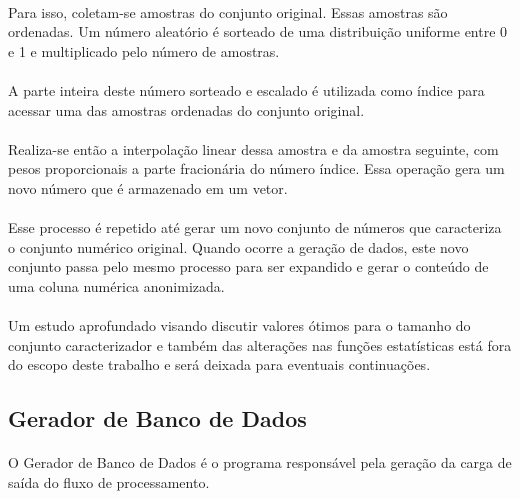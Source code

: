 \paragraph{} Para isso, coletam-se amostras do conjunto original. Essas amostras são ordenadas. Um número aleatório é sorteado de uma distribuição uniforme entre 0 e 1 e multiplicado pelo número de amostras.

\paragraph{} A parte inteira deste número sorteado e escalado é utilizada como índice para acessar uma das amostras ordenadas do conjunto original.

\paragraph{} Realiza-se então a interpolação linear dessa amostra e da amostra seguinte, com pesos proporcionais a parte fracionária do número índice. Essa operação gera um novo número que é armazenado em um vetor.

\paragraph{} Esse processo é repetido até gerar um novo conjunto de números que caracteriza o conjunto numérico original. Quando ocorre a geração de dados, este novo conjunto passa pelo mesmo processo para ser expandido e gerar o conteúdo de uma coluna numérica anonimizada.

\paragraph{} Um estudo aprofundado visando discutir valores ótimos para o tamanho do conjunto caracterizador e também das alterações nas funções estatísticas está fora do escopo deste trabalho e será deixada para eventuais continuações.

\subsection{Gerador de Banco de Dados}

\paragraph{} O Gerador de Banco de Dados é o programa responsável pela geração da carga de saída do fluxo de processamento.

